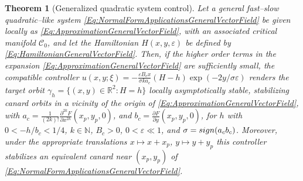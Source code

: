 \documentclass[3p]{elsarticle}
\theoremstyle{plain}
\newtheorem{theorem}{Theorem}[section]
\theoremstyle{remark}
\theoremstyle{definition}
\begin{document}
        
    \begin{theorem}[Generalized quadratic system control]
    \label{Thm:GeneralizedQuadraticControl} Let a general fast--slow quadratic--like system \eqref{Eq:NormalFormApplicationsGeneralVectorField} be given locally as \eqref{Eq:ApproximationGeneralVectorField}, with an associated critical manifold $\mathcal{C}_{0}$, and let the Hamiltonian $H(x,y,\varepsilon)$ be defined by \eqref{Eq:HamiltonianGeneralVectorField}. Then, if the higher order terms in the expansion \eqref{Eq:ApproximationGeneralVectorField} are sufficiently small, the compatible controller $u(x,y;\xi) = -\frac{\varepsilon B_{c} x}{\sigma k a_{c}}(H-h)\exp\left({-2y/\sigma \varepsilon}\right)$ renders the target orbit $\gamma_{h} = \{ (x, y)\in\mathbb{R}^{2}:H=h \}$ locally asymptotically stable, stabilizing canard orbits in a vicinity of the origin of \eqref{Eq:ApproximationGeneralVectorField}, 
    with $a_{c}=\frac{1}{(2k)!}\frac{\partial^{2k}F}{\partial x^{2k}}(x_p,y_p,0)$, and $b_{c} = \frac{\partial F}{\partial y}(x_p,y_p,0)$, for $h$ with $0<-h/b_c<1/4$, $k\in\mathbb{N}$, $B_{c}>0$, $0<\varepsilon \ll 1$, and $\sigma = \emph{sign}(a_{c}b_{c})$. Moreover, under the appropriate translations $x\mapsto x+x_p$, $y\mapsto y+y_p$ this controller stabilizes an equivalent canard near $(x_p,y_p)$ of \eqref{Eq:NormalFormApplicationsGeneralVectorField}.
    \end{theorem}
\end{document}
